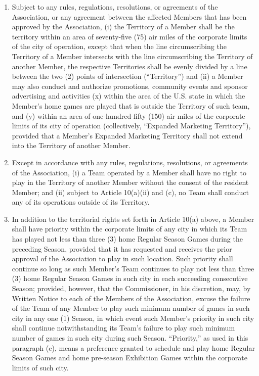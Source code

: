 \documentclass[]{book}
\providecommand{\tightlist}{%
  \setlength{\itemsep}{0pt}\setlength{\parskip}{0pt}}
\begin{document}
\begin{enumerate}
\def\labelenumi{(\alph{enumi})}
\tightlist
\item
  Subject to any rules, regulations, resolutions, or agreements of the Association, or any agreement between the affected Members that has been approved by the Association, (i) the Territory of a Member shall be the territory within an area of seventy-five (75) air miles of the corporate limits of the city of operation, except that when the line circumscribing the Territory of a Member intersects with the line circumscribing the Territory of another Member, the respective Territories shall be evenly divided by a line between the two (2) points of intersection (``Territory'') and (ii) a Member may also conduct and authorize promotions, community events and sponsor advertising and activities (x) within the area of the U.S. state in which the Member's home games are played that is outside the Territory of such team, and (y) within an area of one-hundred-fifty (150) air miles of the corporate limits of its city of operation (collectively, ``Expanded Marketing Territory''), provided that a Member's Expanded Marketing Territory shall not extend into the Territory of another Member.
\item
  Except in accordance with any rules, regulations, resolutions, or agreements of the Association, (i) a Team operated by a Member shall have no right to play in the Territory of another Member without the consent of the resident Member; and (ii) subject to Article 10(a)(ii) and (c), no Team shall conduct any of its operations outside of its Territory.
\item
  In addition to the territorial rights set forth in Article 10(a) above, a Member shall have priority within the corporate limits of any city in which its Team has played not less than three (3) home Regular Season Games during the preceding Season, provided that it has requested and receives the prior approval of the Association to play in such location. Such priority shall continue so long as such Member's Team continues to play not less than three (3) home Regular Season Games in such city in each succeeding consecutive Season; provided, however, that the Commissioner, in his discretion, may, by Written Notice to each of the Members of the Association, excuse the failure of the Team of any Member to play such minimum number of games in such city in any one (1) Season, in which event such Member's priority in such city shall continue notwithstanding its Team's failure to play such minimum number of games in such city during such Season. ``Priority,'' as used in this paragraph (c), means a preference granted to schedule and play home Regular Season Games and home pre-season Exhibition Games within the corporate limits of such city.
\end{enumerate}
\end{document}
